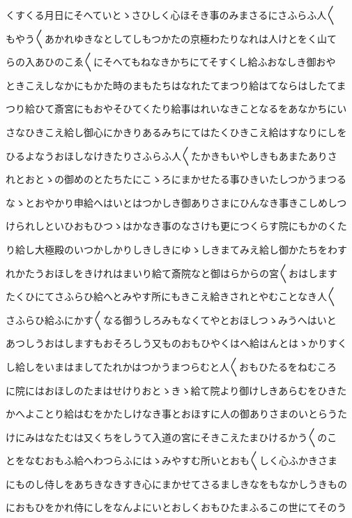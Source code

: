 \documentclass[a4paper,11pt,landscape]{ltjtarticle}
\begin{document}
くすくる月日にそへていとゝさひしく心ほそき事のみまさるにさふらふ人〱
\par\medskip
もやう〱あかれゆきなとしてしもつかたの京極わたりなれは人けとをく山て
\par\medskip
らの入あひのこゑ〱にそへてもねなきかちにてそすくし給ふおなしき御おや
\par\medskip
ときこえしなかにもかた時のまもたちはなれたてまつり給はてならはしたてま
\par\medskip
つり給ひて斎宮にもおやそひてくたり給事はれいなきことなるをあなかちにい
\par\medskip
さなひきこえ給し御心にかきりあるみちにてはたくひきこえ給はすなりにしを
\par\medskip
ひるよなうおほしなけきたりさふらふ人〱たかきもいやしきもあまたありさ
\par\medskip
れとおとゝの御めのとたちたにこゝろにまかせたる事ひきいたしつかうまつる
\par\medskip
なゝとおやかり申給へはいとはつかしき御ありさまにひんなき事きこしめしつ
\par\medskip
けられしといひおもひつゝはかなき事のなさけも更につくらす院にもかのくた
\par\medskip
り給し大極殿のいつかしかりしきしきにゆゝしきまてみえ給し御かたちをわす
\par\medskip
れかたうおほしをきけれはまいり給て斎院なと御はらからの宮〱おはします
\par\medskip
たくひにてさふらひ給へとみやす所にもきこえ給きされとやむことなき人〱
\par\medskip
さふらひ給ふにかす〱なる御うしろみもなくてやとおほしつゝみうへはいと
\par\medskip
あつしうおはしますもおそろしう又ものおもひやくはへ給はんとはゝかりすく
\par\medskip
し給しをいまはましてたれかはつかうまつらむと人〱おもひたるをねむころ
\par\medskip
に院にはおほしのたまはせけりおとゝきゝ給て院より御けしきあらむをひきた
\par\medskip
かへよことり給はむをかたしけなき事とおほすに人の御ありさまのいとらうた
\par\medskip
けにみはなたむは又くちをしうて入道の宮にそきこえたまひけるかう〱のこ
\par\medskip
とをなむおもふ給へわつらふにはゝみやすむ所いとおも〱しく心ふかきさま
\par\medskip
にものし侍しをあちきなきすき心にまかせてさるましきなをもなかしうきもの
\par\medskip
におもひをかれ侍にしをなんよにいとおしくおもひたまふるこの世にてそのう
\end{document}
